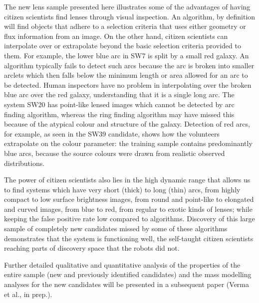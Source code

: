 \documentclass[useAMS,usenatbib,a4paper]{mn2e}
\begin{document}
The new \sw lens sample presented here illustrates some of
the advantages of having
citizen scientists find lenses through visual inspection. An algorithm,
by definition will find objects that adhere to a selection criteria that
uses either geometry or flux information from an image. On the other
hand, citizen scientists can interpolate over or
extrapolate beyond the basic selection criteria provided to them.  For
example, the lower blue arc in SW7 is split by a small red galaxy.  An
algorithm typically fails to detect such arcs because the arc is broken
into smaller arclets which then falls below the minimum length or area
allowed for an arc to be detected. Human inspectors have no
problem in interpolating over the broken blue arc over the red galaxy,
understanding that it is a single long arc. The system SW20 has
point-like lensed images which cannot be detected by arc finding
algorithm, whereas the ring finding algorithm may have missed this because of
the atypical colour and structure of the galaxy. Detection of red arcs, for
example, as seen in the SW39 candidate, shows how the volunteers
extrapolate on the colour parameter: the training sample contains
predominantly blue arcs, because the source colours were drawn from realistic
observed distributions.

The power of citizen scientists also lies in the high dynamic range that
allows us to find systems which have very short (thick) to long (thin)
arcs, from highly compact to low surface brightness images, from round
and point-like to elongated and curved images, from blue to red, from
regular to exotic kinds of lenses; while keeping the false positive rate
low compared to algorithms. Discovery of this large sample of completely
new candidates missed by some of these algorithms demonstrates that the
\sw system is functioning well, the self-taught citizen scientists
reaching parts of discovery space that the robots did not.

Further detailed qualitative and quantitative analysis of the properties
of the entire \sw sample (new and previously identified candidates) and
the mass modelling analyses for the new candidates will be presented in
a subsequent \sw paper (Verma et al., in prep.).
\end{document}
